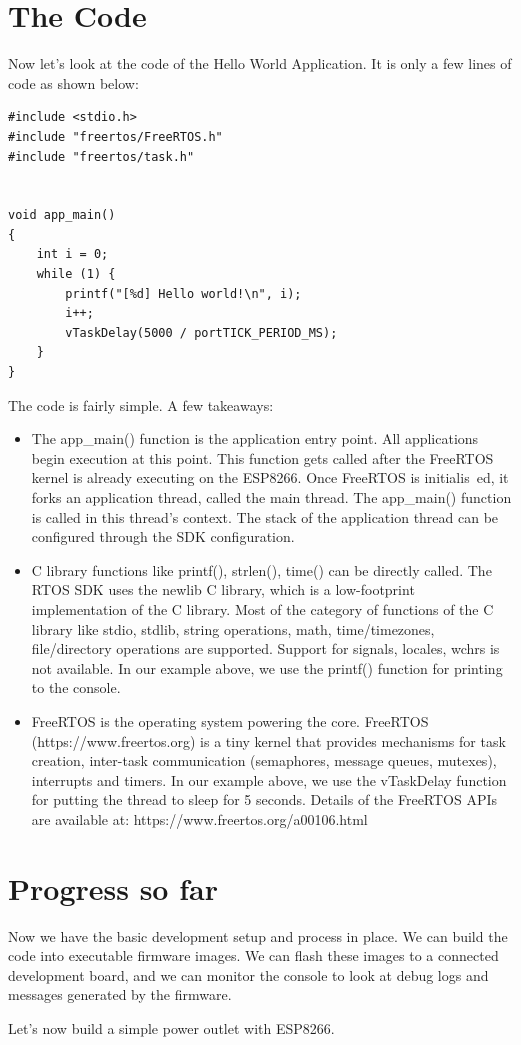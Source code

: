 \documentclass[main.tex]{subfiles}
\begin{document}
\section{The Code}
Now let's look at the code of the Hello World Application. It is only a few lines of code as shown below:
\begin{verbatim}
#include <stdio.h>
#include "freertos/FreeRTOS.h"
#include "freertos/task.h"


void app_main()
{
    int i = 0;
    while (1) {
        printf("[%d] Hello world!\n", i);
        i++;
        vTaskDelay(5000 / portTICK_PERIOD_MS);
    }
}
\end{verbatim}
The code is fairly simple. A few takeaways:
\begin{itemize}
\item The app\_main() function is the application entry point. All applications begin execution at this point. This function gets called after the FreeRTOS kernel is already executing on the ESP8266. Once FreeRTOS is initialis\
ed, it forks an application thread, called the main thread. The app\_main() function is called in this thread's context. The stack of the application thread can be configured through the SDK configuration.
\item C library functions like printf(), strlen(), time() can be directly called. The RTOS SDK uses the newlib C library, which is a low-footprint implementation of the C library. Most of the category of functions of the C library like stdio, stdlib, string operations, math, time/timezones, file/directory operations are supported. Support for signals, locales, wchrs is not available. In our example above, we use the printf() function for printing to the console.
\item FreeRTOS is the operating system powering the core. FreeRTOS (https://www.freertos.org) is a tiny kernel that provides mechanisms for task creation, inter-task communication (semaphores, message queues, mutexes), interrupts and timers. In our example above, we use the vTaskDelay function for putting the thread to sleep for 5 seconds. Details of the FreeRTOS APIs are available at: https://www.freertos.org/a00106.html
\end{itemize}

\section{Progress so far}
Now we have the basic development setup and process in place. We can build the code into executable firmware images. We can flash these images to a connected development board, and we can monitor the console to look at debug logs and messages generated by the firmware. 

Let's now build a simple power outlet with ESP8266.
\end{document}
